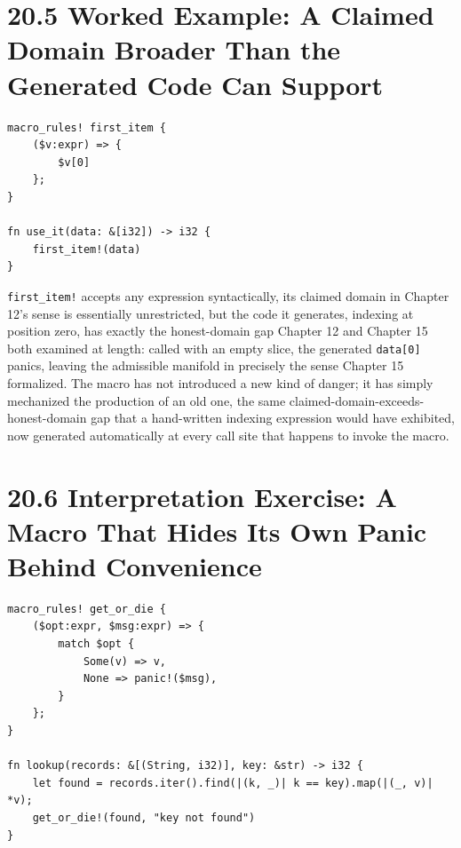 \documentclass[11pt]{book}
\begin{document}
\section*{20.5 Worked Example: A Claimed Domain Broader Than the Generated Code Can Support}

\begin{lstlisting}
macro_rules! first_item {
    ($v:expr) => {
        $v[0]
    };
}

fn use_it(data: &[i32]) -> i32 {
    first_item!(data)
}
\end{lstlisting}

\texttt{first\_item!} accepts any expression syntactically, its claimed domain in Chapter 12's sense is essentially unrestricted, but the code it generates, indexing at position zero, has exactly the honest-domain gap Chapter 12 and Chapter 15 both examined at length: called with an empty slice, the generated \texttt{data[0]} panics, leaving the admissible manifold in precisely the sense Chapter 15 formalized. The macro has not introduced a new kind of danger; it has simply mechanized the production of an old one, the same claimed-domain-exceeds-honest-domain gap that a hand-written indexing expression would have exhibited, now generated automatically at every call site that happens to invoke the macro.

\section*{20.6 Interpretation Exercise: A Macro That Hides Its Own Panic Behind Convenience}

\begin{lstlisting}
macro_rules! get_or_die {
    ($opt:expr, $msg:expr) => {
        match $opt {
            Some(v) => v,
            None => panic!($msg),
        }
    };
}

fn lookup(records: &[(String, i32)], key: &str) -> i32 {
    let found = records.iter().find(|(k, _)| k == key).map(|(_, v)| *v);
    get_or_die!(found, "key not found")
}
\end{lstlisting}
\end{document}
